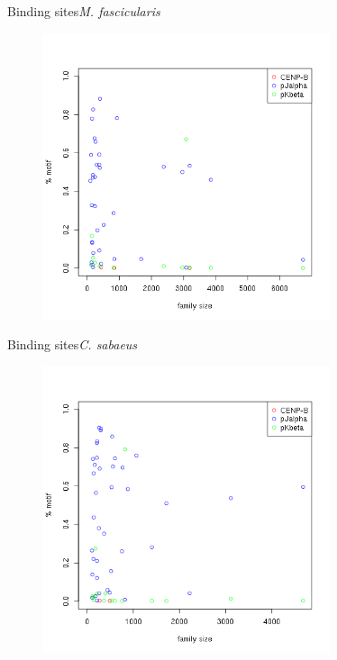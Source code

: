 \documentclass[11pt]{beamer}
\begin{document}
\begin{frame}{Binding sites}{\textit{M. fascicularis}}
	\begin{figure}
		\includegraphics[width=0.75\textwidth]{img/Mf_motifs.png}
	\end{figure}	
\end{frame}

\begin{frame}{Binding sites}{\textit{C. sabaeus}}
\begin{center}
	\begin{figure}
		\includegraphics[width=0.75\textwidth]{img/Csa_motifs.png}
	\end{figure}	
\end{center}
\end{frame}
\end{document}
